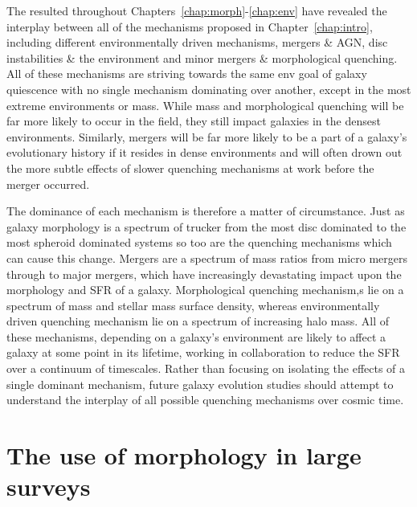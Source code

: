 The resulted throughout Chapters~\ref{chap:morph}-\ref{chap:env} have revealed the interplay between all of the mechanisms proposed in Chapter~\ref{chap:intro}, including different environmentally driven mechanisms, mergers \& AGN, disc instabilities \& the environment and minor mergers \& morphological quenching. All of these mechanisms are striving towards the same env goal of galaxy quiescence with no single mechanism dominating over another, except in the most extreme environments or mass. While mass and morphological quenching will be far more likely to occur in the field, they still impact galaxies in the densest environments. Similarly, mergers will be far more likely to be a part of a galaxy's evolutionary history if it resides in dense environments and will often drown out the more subtle effects of slower quenching mechanisms at work before the merger occurred. 

The dominance of each mechanism is therefore a matter of circumstance. Just as galaxy morphology is a spectrum of trucker from the most disc dominated to the most spheroid dominated systems so too are the quenching mechanisms which can cause this change. Mergers are a spectrum of mass ratios from micro mergers \citep{carlin16} through to major mergers, which have increasingly devastating impact upon the morphology and SFR of a galaxy. Morphological quenching mechanism,s lie on a spectrum of mass and stellar mass surface density, whereas environmentally driven quenching mechanism lie on a spectrum of increasing halo mass. All of these mechanisms, depending on a galaxy's environment are likely to affect a galaxy at some point in its lifetime, working in collaboration to reduce the SFR over a continuum of timescales. Rather than focusing on isolating the effects of a single  dominant mechanism, future galaxy evolution studies should attempt to understand the interplay of all possible quenching mechanisms over cosmic time. 

\section{The use of morphology in large surveys}\label{sec:usemorph}

